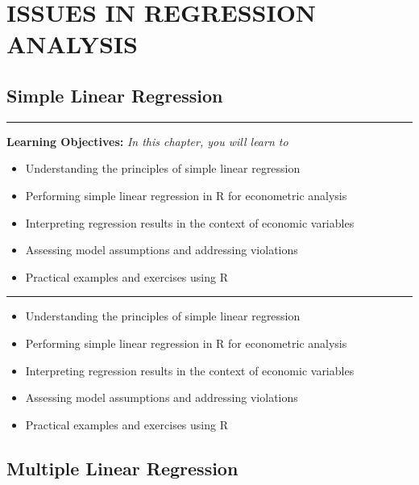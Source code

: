 \documentclass[
  letterpaper,
  twoside,
  openany]{scrbook}
\providecommand{\abstractname}{Learning Objectives} %
\newenvironment{objectives}[1]{%
	\hrule
	\vspace{5pt}
	\small\textbf{\abstractname: } 
	\newline
	\vspace{0.1cm}
	\small\emph{#1} %
	\itshape %
}{%
	\vspace{5pt}
	\hrule
	\vspace{0.6cm}
}
\begin{document}
\part{ISSUES IN REGRESSION ANALYSIS}

\hypertarget{simple-linear-regression}{%
\chapter{Simple Linear Regression}\label{simple-linear-regression}}

\begin{objectives}{In this chapter, you will learn to}
\begin{itemize}

\item{Understanding the principles of simple linear regression}

\item{Performing simple linear regression in R for econometric analysis}

\item{Interpreting regression results in the context of economic variables}

\item{Assessing model assumptions and addressing violations}

\item{Practical examples and exercises using R}

\end{itemize}

\end{objectives}

\begin{itemize}
\item
  Understanding the principles of simple linear regression
\item
  Performing simple linear regression in R for econometric analysis
\item
  Interpreting regression results in the context of economic variables
\item
  Assessing model assumptions and addressing violations
\item
  Practical examples and exercises using R
\end{itemize}

\hypertarget{multiple-linear-regression}{%
\chapter{Multiple Linear Regression}\label{multiple-linear-regression}}
\end{document}
